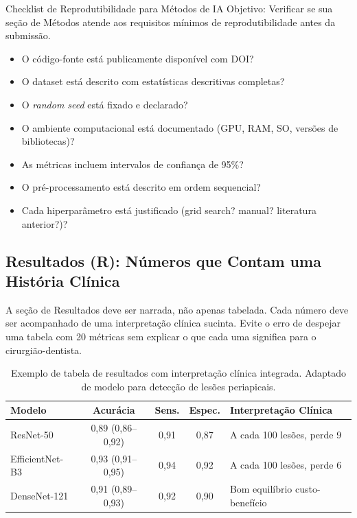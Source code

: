 \begin{pratica}{Checklist de Reprodutibilidade para Métodos de IA}
  Objetivo: Verificar se sua seção de Métodos atende aos requisitos mínimos de
  reprodutibilidade antes da submissão.

  \begin{itemize}
    \item[\checkmark] O código-fonte está publicamente disponível com DOI?
    \item[\checkmark] O dataset está descrito com estatísticas descritivas
      completas?
    \item[\checkmark] O \textit{random seed} está fixado e declarado?
    \item[\checkmark] O ambiente computacional está documentado (GPU, RAM, SO,
      versões de bibliotecas)?
    \item[\checkmark] As métricas incluem intervalos de confiança de 95\%?
    \item[\checkmark] O pré-processamento está descrito em ordem sequencial?
    \item[\checkmark] Cada hiperparâmetro está justificado (grid search? manual?
      literatura anterior?)?
  \end{itemize}
\end{pratica}

\subsection{Resultados (R): Números que Contam uma História Clínica}

A seção de Resultados deve ser narrada, não apenas tabelada. Cada número deve ser
acompanhado de uma interpretação clínica sucinta. Evite o erro de despejar uma
tabela com 20 métricas sem explicar o que cada uma significa para o
cirurgião-dentista.

\begin{table}[H]
  \centering
  \caption{Exemplo de tabela de resultados com interpretação clínica integrada.
  Adaptado de modelo para detecção de lesões periapicais.}
  \label{tab:exemplo-resultados}
  \begin{tabularx}{\textwidth}{lcccX}
    \toprule
    \textbf{Modelo} & \textbf{Acurácia} & \textbf{Sens.} & \textbf{Espec.} & \textbf{Interpretação Clínica} \\
    \midrule
    ResNet-50   & 0,89 (0,86--0,92) & 0,91 & 0,87 & A cada 100 lesões, perde 9 \\
    EfficientNet-B3 & 0,93 (0,91--0,95) & 0,94 & 0,92 & A cada 100 lesões, perde 6 \\
    DenseNet-121 & 0,91 (0,89--0,93) & 0,92 & 0,90 & Bom equilíbrio custo-benefício \\
    \bottomrule
  \end{tabularx}
\end{table}

